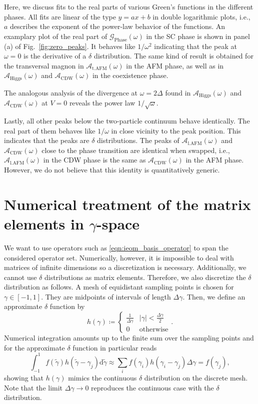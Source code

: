 \documentclass[
    reprint, 
    aps,
    preprintnumbers,
    twocolumn,
    prb,
    superscriptaddress
]{revtex4-2}
\newcommand{\greens}[1]{\mathcal{G}_\text{#1} (\omega)}
\newcommand{\spectral}[1]{\mathcal{A}_\text{#1}  (\omega)}
\begin{document}
Here, we discuss fits to the real parts of various Green's functions in the different phases.
All fits are linear of the type $y = ax + b$ in double logarithmic plots, i.e., $a$ describes the exponent of
the power-law behavior of the functions.
An examplary plot of the real part of $\greens{Phase}$ 
in the SC phase is shown in panel (a) of Fig.\ \ref{fig:zero_peaks}.
It behaves like $1/\omega^2$ indicating that the peak 
at $\omega=0$ is the derivative of a $\delta$ distribution.
The same kind of result is obtained for the transversal magnon in $\spectral{t.AFM}$ in the AFM phase, 
as well as in $\spectral{Higgs}$ and $\spectral{CDW}$ in the coexistence phase.

The analogous analysis of the divergence at $\omega = 2\Delta$ 
found in $\spectral{Higgs}$ and $\spectral{CDW}$ at $V=0$
reveals the power law  $1/\sqrt{\omega}$.

Lastly, all other peaks below the two-particle continuum behave identically.
The real part of them behaves like $1/\omega$ in close vicinity to the peak position.
This indicates that the peaks are $\delta$ distributions.
The peaks of $\spectral{l.AFM}$ and $\spectral{CDW}$ close to the phase transition are identical 
when swapped, i.e., $\spectral{l.AFM}$ in the CDW phase is the same as $\spectral{CDW}$ in the AFM phase.
However, we do not believe that this identity is quantitatively generic.

\section{Numerical treatment of the matrix elements in $\gamma$-space}
\label{sec:numerical_ieom}


We want to use operators such as \eqref{eqn:ieom_basis_operator} to span the considered operator set.
Numerically, however, it is impossible to deal with matrices of infinite dimensions so a discretization is necessary.
Additionally, we cannot use $\delta$ distributions as matrix elements. 
Therefore, we also discretize the $\delta$ distribution as follows.
A mesh of equidistant sampling points is chosen for $\gamma\in[-1,1]$.
They are midpoints of intervals of length $\Delta \gamma$.
Then, we define an approximate $\delta$ function by
\begin{equation}
    h(\gamma) \coloneqq \begin{cases}
        \frac{1}{\Delta \gamma} & |\gamma| < \frac{\Delta \gamma}{2} \\ 0 & \text{otherwise}
    \end{cases}.
\end{equation}
Numerical integration amounts up to the finite sum over the sampling points and for the approximate $\delta$ function in particular reads
\begin{equation}
    \int_{-1}^1 f(\tilde{\gamma}) h(\tilde{\gamma} - \gamma_j) \mathrm{d} \tilde{\gamma} \approx 
		\sum_i f(\gamma_i) h(\gamma_i - \gamma_j) \Delta \gamma = f(\gamma_j),
\end{equation}
showing that $h(\gamma)$ mimics the continuous $\delta$ distribution on the discrete mesh.
Note that the limit $\Delta \gamma \to 0$ reproduces the continuous case with the $\delta$ distribution.
\end{document}
